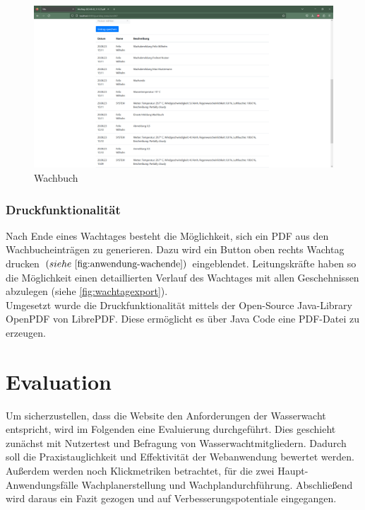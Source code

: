 \documentclass[fontsize=12pt,openright,oneside,paper=a4,BCOR=1cm]{scrbook}
\begin{document}
\begin{figure}[H]
  \centering
    \includegraphics[width=0.8\linewidth]{Anlagen/Anwendung/8-6WachtagWachbuchLog.png}
    \caption{Wachbuch}
  \label{fig:anwendung-wachbuch}
\end{figure}


\subsection{Druckfunktionalität}

Nach Ende eines Wachtages besteht die M\"oglichkeit, sich ein PDF aus den Wachbucheintr\"agen zu generieren. Dazu wird ein Button oben rechts \glqq Wachtag drucken\grqq{} $(siehe~\ref{fig:anwendung-wachende})$ eingeblendet. Leitungskr\"afte haben so die M\"oglichkeit einen detaillierten Verlauf des Wachtages mit allen Geschehnissen abzulegen (siehe \ref{fig:wachtagexport}). \\
Umgesetzt wurde die Druckfunktionalit\"at mittels der Open-Source Java-Library OpenPDF von LibrePDF. Diese erm\"oglicht es \"uber Java Code eine PDF-Datei zu erzeugen.\\



%
%

\newpage
\chapter{Evaluation}

Um sicherzustellen, dass die Website den Anforderungen der Wasserwacht entspricht, wird im Folgenden eine Evaluierung durchgeführt. Dies geschieht zunächst mit Nutzertest und Befragung von Wasserwachtmitgliedern. Dadurch soll die Praxistauglichkeit und Effektivität der Webanwendung bewertet werden. Außerdem werden noch \glqq Klickmetriken\grqq{} betrachtet, für die zwei Haupt-Anwendungsfälle Wachplanerstellung und Wachplandurchführung. Abschließend wird daraus ein Fazit gezogen und auf Verbesserungspotentiale eingegangen. 
\end{document}

